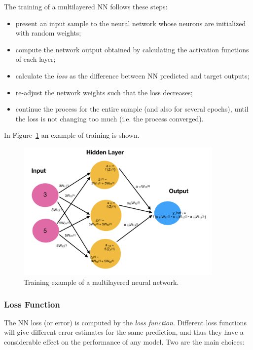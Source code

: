 The training of a multilayered NN follows these steps:

\begin{itemize}
\tightlist
\item present an input sample to the neural network whose neurons are initialized with random weights;
\item compute the network output obtained by calculating the activation functions of each layer;
\item calculate the \emph{loss} as the difference between NN predicted and target outputs;
\item re-adjust the network weights such that the loss decreases;
\item continue the process for the entire sample (and also for several epochs), until the loss is not changing too much (i.e. the process converged).
\end{itemize}
In Figure~\ref{fig:training} an example of training is shown.

\begin{figure}[htb]
\centering
\includegraphics[width=0.9\textwidth]{figures/training_nn}
\caption{Training example of a multilayered neural network.}
\label{fig:training}
\end{figure}

\subsubsection{Loss Function}
The NN loss (or error) is computed by the \emph{loss function}. Different loss functions will give different error estimates for the same prediction, and thus they have a considerable effect on the performance of any model. Two are the main choices:

